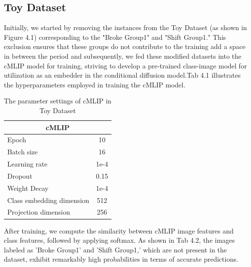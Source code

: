 \subsection{Toy Dataset}
Initially, we started by removing the instances from the Toy Dataset (as shown in Figure 4.1) corresponding to the "Broke Group1" and "Shift Group1." This exclusion ensures that these groups do not contribute to the training add a space in between the period and subsequently, we fed these modified datasets into the cMLIP model for training, striving to develop a pre-trained class-image model for utilization as an embedder in the conditional diffusion model.Tab 4.1 illustrates the hyperparameters employed in training the cMLIP model.
\begin{table}[H]
    \centering
    \renewcommand{\arraystretch}{1} %
    \begin{tabular}[h]{lc} \hline 
        \multicolumn{2}{c}{cMLIP} \\ \hline
        Epoch & 10\\ 
        Batch size &  16\\ 
        Learning rate & 1e-4\\ 
        Dropout & 0.15\\
        Weight Decay & 1e-4\\
        Class embedding dimension & 512 \\
        Projection dimension & 256 \\ \hline 
    \end{tabular}
    \caption{The parameter settings of cMLIP in Toy Dataset}
    \label{tab:experimental_config}
\end{table}
After training, we compute the similarity between cMLIP image features and class features, followed by applying softmax. As shown in Tab 4.2, the images labeled as 'Broke Group1' and 'Shift Group1,' which are not present in the dataset, exhibit remarkably high probabilities in terms of accurate predictions.

